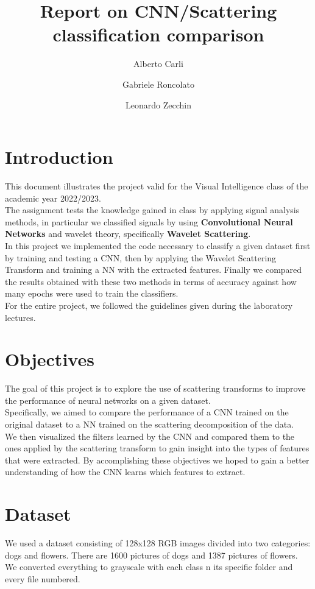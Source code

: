 \documentclass{report}
\title{Report on CNN/Scattering classification comparison}
\author{Alberto Carli \and Gabriele Roncolato \and Leonardo Zecchin }
\date{}
\begin{document}
\maketitle
\tableofcontents
\pagebreak

\chapter{Introduction}
This document illustrates the project valid for the Visual Intelligence class of the academic year 2022/2023. \\
The assignment tests the knowledge gained in class by applying signal analysis methods, in particular we classified signals by using \textbf{Convolutional Neural Networks} and wavelet theory, specifically  \textbf{Wavelet Scattering}. \\
In this project we implemented the code necessary to classify a given dataset first by training and testing a CNN, then by applying the Wavelet Scattering Transform and training a NN with the extracted features.
Finally we compared the results obtained with these two methods in terms of accuracy against how many epochs were used to train the classifiers. \\
For the entire project, we followed the guidelines given during the laboratory lectures.


\chapter{Objectives}
The goal of this project is to explore the use of scattering transforms to improve the performance of neural networks on a given dataset.\\
Specifically, we aimed to compare the performance of a CNN trained on the original dataset to a NN trained on the scattering decomposition of the data.\\

We then visualized the filters learned by the CNN and compared them to the ones applied by the scattering transform to gain insight into the types of features that were extracted. 
By accomplishing these objectives we hoped to gain a better understanding of how the CNN learns which features to extract.

\chapter{Dataset}
We used a dataset consisting of 128x128 RGB images divided into two categories: dogs and flowers. There are 1600 pictures of dogs and 1387 pictures of flowers.
We converted everything to grayscale with each class n its specific folder and every file numbered.
\end{document}
